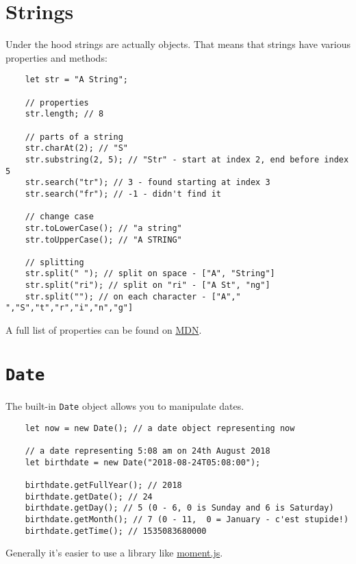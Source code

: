 \section{Strings}

Under the hood strings are actually objects. That means that strings have various properties and methods:

\begin{verbatim}
    let str = "A String";

    // properties
    str.length; // 8

    // parts of a string
    str.charAt(2); // "S"
    str.substring(2, 5); // "Str" - start at index 2, end before index 5
    str.search("tr"); // 3 - found starting at index 3
    str.search("fr"); // -1 - didn't find it

    // change case
    str.toLowerCase(); // "a string"
    str.toUpperCase(); // "A STRING"

    // splitting
    str.split(" "); // split on space - ["A", "String"]
    str.split("ri"); // split on "ri" - ["A St", "ng"]
    str.split(""); // on each character - ["A"," ","S","t","r","i","n","g"]
\end{verbatim}

A full list of properties can be found on \href{https://developer.mozilla.org/en-US/docs/Web/JavaScript/Reference/Global_Objects/String}{MDN}.

\pagebreak

\section{\texttt{Date}}

The built-in \texttt{Date} object allows you to manipulate dates.

\begin{verbatim}
    let now = new Date(); // a date object representing now

    // a date representing 5:08 am on 24th August 2018
    let birthdate = new Date("2018-08-24T05:08:00");

    birthdate.getFullYear(); // 2018
    birthdate.getDate(); // 24
    birthdate.getDay(); // 5 (0 - 6, 0 is Sunday and 6 is Saturday)
    birthdate.getMonth(); // 7 (0 - 11,  0 = January - c'est stupide!)
    birthdate.getTime(); // 1535083680000
\end{verbatim}

Generally it's easier to use a library like \href{http://momentjs.com}{moment.js}.


